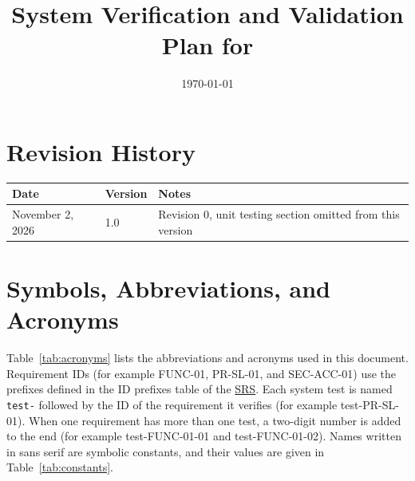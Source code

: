 \documentclass[12pt, titlepage]{article}
\begin{document}
\title{System Verification and Validation Plan for \progname{}} 
\author{\authname}
\date{\today}
	
\maketitle


\section*{Revision History}

\begin{tabularx}{\textwidth}{p{3cm}p{2cm}X}
\toprule {\bf Date} & {\bf Version} & {\bf Notes}\\
\midrule
November 2, 2026 & 1.0 & Revision 0, unit testing section omitted from this version\\
\bottomrule
\end{tabularx}

\newpage

\tableofcontents

\listoftables

\newpage

\section{Symbols, Abbreviations, and Acronyms}

Table~\ref{tab:acronyms} lists the abbreviations and acronyms used in this
document. Requirement IDs (for example FUNC-01, PR-SL-01, and SEC-ACC-01) use
the prefixes defined in the ID prefixes table of the \href{https://github.com/arjunkarthik123/fitness-finance-application/blob/main/pdfs/SRS-Volere/SRS.pdf}{SRS}. Each
system test is named \texttt{test-} followed by the ID of the requirement it
verifies (for example test-PR-SL-01). When one requirement has more than one
test, a two-digit number is added to the end (for example test-FUNC-01-01 and
test-FUNC-01-02). Names written in \textsf{sans serif} are symbolic constants,
and their values are given in Table~\ref{tab:constants}.
\end{document}
